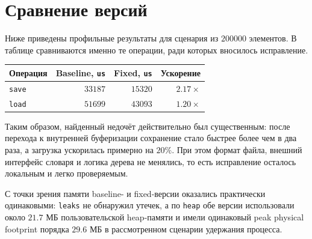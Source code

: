 \section{Сравнение версий}

Ниже приведены профильные результаты для сценария из \(200000\) элементов. В таблице сравниваются именно те операции, ради которых вносилось исправление.

\begin{center}
\begin{tabular}{|l|r|r|r|}
\hline
Операция & Baseline, \texttt{us} & Fixed, \texttt{us} & Ускорение \\
\hline
\texttt{save} & \(33187\) & \(15320\) & \(2.17\times\) \\
\hline
\texttt{load} & \(51699\) & \(43093\) & \(1.20\times\) \\
\hline
\end{tabular}
\end{center}

Таким образом, найденный недочёт действительно был существенным: после перехода к внутренней буферизации сохранение стало быстрее более чем в два раза, а загрузка ускорилась примерно на \(20\%\). При этом формат файла, внешний интерфейс словаря и логика дерева не менялись, то есть исправление осталось локальным и легко проверяемым.

С точки зрения памяти baseline- и fixed-версии оказались практически одинаковыми: \texttt{leaks} не обнаружил утечек, а по \texttt{heap} обе версии использовали около \(21.7\) МБ пользовательской heap-памяти и имели одинаковый peak physical footprint порядка \(29.6\) МБ в рассмотренном сценарии удержания процесса.
\pagebreak
